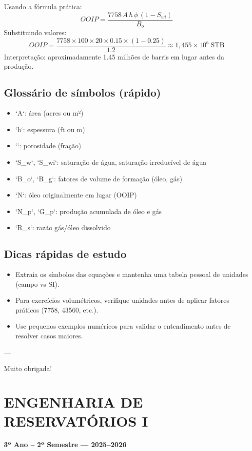 \documentclass[11pt,a4paper]{article}
\begin{document}
Usando a fórmula prática:
$$
OOIP = \frac{7758\,A\,h\,\phi\,(1-S_{wi})}{B_o}
$$
Substituindo valores:
$$
OOIP = \frac{7758 \times 100 \times 20 \times 0.15 \times (1-0.25)}{1.2} \approx 1{,}455\times10^{6}\;\text{STB}
$$
Interpretação: aproximadamente 1.45 milhões de barris em lugar antes da produção.

\subsection{Glossário de símbolos (rápido)}
\begin{itemize}
\item `A`: área (acres ou m²)
\item `h`: espessura (ft ou m)
\item `\phi`: porosidade (fração)
\item `S_w`, `S_{wi}`: saturação de água, saturação irreducível de água
\item `B_o`, `B_g`: fatores de volume de formação (óleo, gás)
\item `N`: óleo originalmente em lugar (OOIP)
\item `N_p`, `G_p`: produção acumulada de óleo e gás
\item `R_s`: razão gás/óleo dissolvido
\end{itemize}

\subsection{Dicas rápidas de estudo}
\begin{itemize}
\item Extraia os símbolos das equações e mantenha uma tabela pessoal de unidades (campo vs SI).
\item Para exercícios volumétricos, verifique unidades antes de aplicar fatores práticos (7758, 43560, etc.).
\item Use pequenos exemplos numéricos para validar o entendimento antes de resolver casos maiores.
\end{itemize}

---

Muito obrigada!




\section{ENGENHARIA DE RESERVATÓRIOS I}
\textbf{3º Ano – 2º Semestre — 2025–2026}
\end{document}
